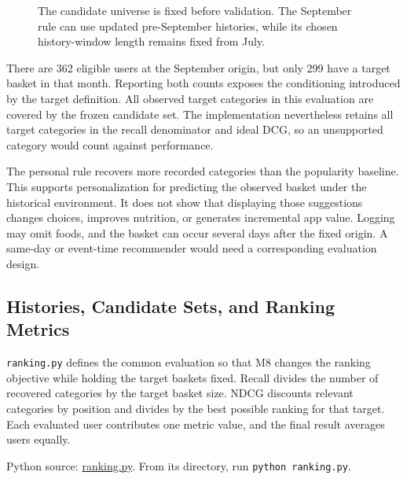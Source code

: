 \begin{figure}[htbp]
\centering

\caption{The candidate universe is fixed before validation. The September rule can use updated pre-September histories, while its chosen history-window length remains fixed from July.}\label{fig:M07_mhealth_timing}
\end{figure}

There are 362 eligible users at the September origin, but only 299 have
a target basket in that month. Reporting both counts exposes the
conditioning introduced by the target definition. All observed target
categories in this evaluation are covered by the frozen candidate set.
The implementation nevertheless retains all target categories in the
recall denominator and ideal DCG, so an unsupported category would count
against performance.

The personal rule recovers more recorded categories than the popularity
baseline. This supports personalization for predicting the observed
basket under the historical environment. It does not show that
displaying those suggestions changes choices, improves nutrition, or
generates incremental app value. Logging may omit foods, and the basket
can occur several days after the fixed origin. A same-day or event-time
recommender would need a corresponding evaluation design.

\hypertarget{M07-histories-candidate-sets-and-ranking-metrics}{%
\subsection{Histories, Candidate Sets, and Ranking
Metrics}\label{M07-histories-candidate-sets-and-ranking-metrics}}

\noindent \texttt{ranking.py} defines the common evaluation so that M8 changes the
ranking objective while holding the target baskets fixed. Recall divides
the number of recovered categories by the target basket size. NDCG
discounts relevant categories by position and divides by the best
possible ranking for that target. Each evaluated user contributes one
metric value, and the final result averages users equally.

\FloatBarrier
{}
Python source:
\href{../03_Data_and_Code/mHealth/recurring_examples/ranking.py}{ranking.py}.
From its directory, run \texttt{python\ ranking.py}.

